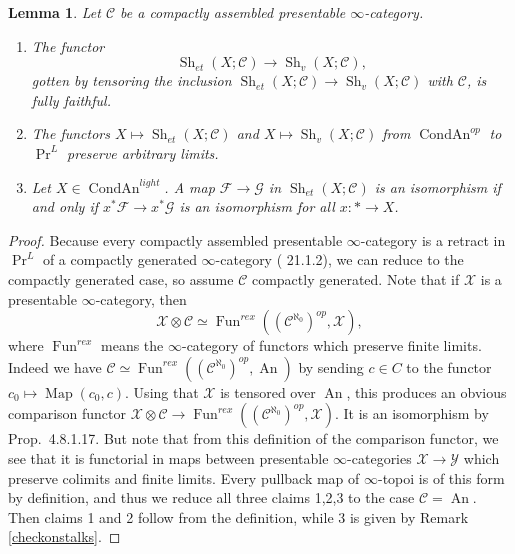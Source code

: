\documentclass[12pt]{article}
\newtheorem{lemma}[theorem]{Lemma}
\newcommand{\on}{\operatorname}
\begin{document}
\begin{lemma}\label{compassgood}
Let $\mathcal{C}$ be a compactly assembled presentable $\infty$-category.
\begin{enumerate}
\item The functor
$$\on{Sh}_{et}(X;\mathcal{C})\to\on{Sh}_v(X;\mathcal{C}),$$
gotten by tensoring the inclusion $\on{Sh}_{et}(X;\mathcal{C})\to\on{Sh}_v(X;\mathcal{C})$ with $\mathcal{C}$, is fully faithful.
\item The functors $X\mapsto \on{Sh}_{et}(X;\mathcal{C})$ and $X\mapsto \on{Sh}_v(X;\mathcal{C})$ from $\on{CondAn}^{op}$ to $\on{Pr}^L$ preserve arbitrary limits.
\item Let $X\in\on{CondAn}^{light}$.  A map $\mathcal{F}\to\mathcal{G}$ in $\on{Sh}_{et}(X;\mathcal{C})$ is an isomorphism if and only if $x^\ast\mathcal{F}\to x^\ast\mathcal{G}$ is an isomorphism for all $x:\ast \to X$.
\end{enumerate}
\end{lemma}
\begin{proof}
Because every compactly assembled presentable $\infty$-category is a retract in $\on{Pr}^L$ of a compactly generated $\infty$-category (\cite{LurieSAG} 21.1.2), we can reduce to the compactly generated case, so assume $\mathcal{C}$ compactly generated.  Note that if $\mathcal{X}$ is a presentable $\infty$-category, then
$$\mathcal{X}\otimes\mathcal{C}\simeq \on{Fun}^{rex}((\mathcal{C}^{\aleph_0})^{op},\mathcal{X}),$$
where $\on{Fun}^{rex}$ means the $\infty$-category of functors which preserve finite limits.  Indeed we have $\mathcal{C}\simeq\on{Fun}^{rex}((\mathcal{C}^{\aleph_0})^{op},\on{An})$ by sending $c\in C$ to the functor $c_0\mapsto \on{Map}(c_0,c)$.  Using that $\mathcal{X}$ is tensored over $\on{An}$, this produces an obvious comparison functor $\mathcal{X}\otimes \mathcal{C}\to \on{Fun}^{rex}((\mathcal{C}^{\aleph_0})^{op},\mathcal{X})$.  It is an isomorphism by \cite{LurieHA} Prop.\ 4.8.1.17.  But note that from this definition of the comparison functor, we see that it is functorial in maps between presentable $\infty$-categories $\mathcal{X}\to\mathcal{Y}$ which preserve colimits and finite limits.  Every pullback map of $\infty$-topoi is of this form by definition, and thus we reduce all three claims 1,2,3 to the case $\mathcal{C}=\on{An}$.  Then claims 1 and 2 follow from the definition, while 3 is given by Remark \ref{checkonstalks}.
\end{proof}
\end{document}
